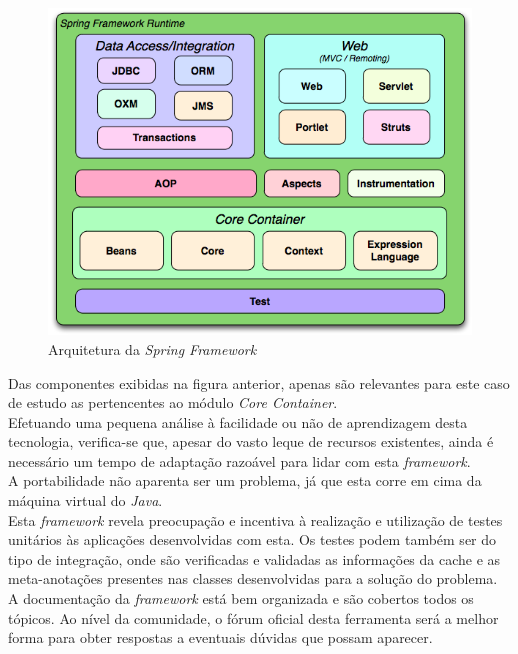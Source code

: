 \begin{figure}[!h]
\centering
\includegraphics[scale=.4]{img/spring}
\caption{Arquitetura da \textit{Spring Framework}}
\end{figure}

Das componentes exibidas na figura anterior, apenas são relevantes para este caso de estudo as pertencentes ao módulo \textit{Core Container}.\\

Efetuando uma pequena análise à facilidade ou não de aprendizagem desta tecnologia, verifica-se que, apesar do vasto leque de recursos existentes, ainda é necessário um tempo de adaptação razoável para lidar com esta \textit{framework}.\\

A portabilidade não aparenta ser um problema, já que esta corre em cima da máquina virtual do \textit{Java}.\\

Esta \textit{framework} revela preocupação e incentiva à realização e utilização de testes unitários às aplicações desenvolvidas com esta.
Os testes podem também ser do tipo de integração, onde são verificadas e validadas as informações da cache e as meta-anotações presentes nas classes desenvolvidas para a solução do problema.\\

A documentação da \textit{framework} está bem organizada e são cobertos todos os tópicos.
Ao nível da comunidade, o fórum oficial desta ferramenta será a melhor forma para obter respostas a eventuais dúvidas que possam aparecer.

